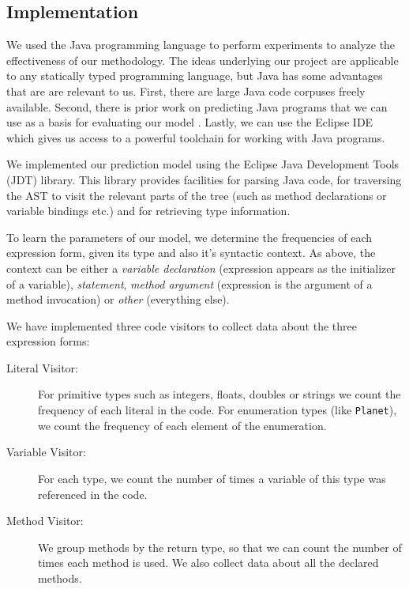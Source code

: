 \documentclass{article} %
\begin{document}
\subsection*{Implementation}
We used the Java programming language to perform experiments to analyze the effectiveness of our methodology. The ideas underlying our project are applicable to any statically typed programming language, but Java has some advantages that are are relevant to us. First, there are large Java code corpuses freely available. Second, there is prior work on predicting Java programs that we can use as a basis for evaluating our model \cite{QualitasCorpus:APSEC:2010}. Lastly, we can use the Eclipse IDE which gives us access to a powerful toolchain for working with Java programs.

We implemented our prediction model using the Eclipse Java Development Tools (JDT) library. This library provides facilities for parsing Java code, for traversing the AST to visit the relevant parts of the tree (such as method declarations or variable bindings etc.) and for retrieving type information.

To learn the parameters of our model, we determine the frequencies of each expression form, given its type and also it's syntactic context.
As above, the context can be either a \textit{variable declaration} (expression appears as the initializer of a variable), \textit{statement}, \textit{method argument} (expression is the argument of a method invocation) or \textit{other} (everything else).

We have implemented three code visitors to collect data about the three expression forms:

\begin{description}
   \item[Literal Visitor:] For primitive types such as integers, floats, doubles or strings we count the frequency of each literal in the code. For enumeration types (like \texttt{Planet}), we count the frequency of each element of the enumeration.

   \item[Variable Visitor:] For each type, we count the number of times a variable of this type was referenced in the code.

   \item[Method Visitor:] We group methods by the return type, so that we can count the number of times each method is used. We also collect data about all the declared methods.
\end{description}
\end{document}
